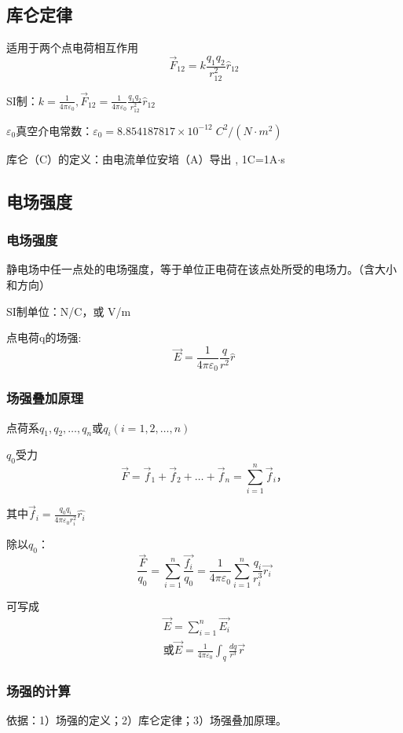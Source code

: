 \documentclass[12pt, UTF8, AutoFakeBold]{ctexart} %
\begin{document}
\subsection{库仑定律}
适用于两个点电荷相互作用
\[
    \vec{F}_{12}=k\frac{q_1q_2}{r_{12}^2}\hat{r}_{12}
\]

SI制：$k=\frac{1}{4\pi\varepsilon_0},\vec{F}_{12}=\frac{1}{4\pi\varepsilon_0}\frac{q_1q_2}{r_{12}^2}\hat{r}_{12}$

$\varepsilon_0$真空介电常数：$\varepsilon_0=8.854187817\times 10^{-12}\;C^2/(N\cdot m^2)$

库仑（C）的定义：由电流单位安培（A）导出 , 1C=1A$\cdot$s

\subsection{电场强度}
\subsubsection{电场强度}
静电场中任一点处的电场强度，等于单位正电荷在该点处所受的电场力。（含大小和方向）

SI制单位：N/C，或 V/m

点电荷q的场强:
\[
    \vec{E}=\frac{1}{4\pi\varepsilon_0}\frac{q}{r^2}\hat{r}
\]
\subsubsection{场强叠加原理}
点荷系$q_1,q_2,\dots,q_n$或$q_i(i=1,2,\dots,n)$

$q_0$受力
\[
    \vec{F}=\vec{f}_1+\vec{f}_2+\dots+\vec{f}_n=\sum\limits_{i=1}^{n}\vec{f}_i，
\]

其中$\vec{f}_i=\frac{q_0q_i}{4\pi\varepsilon_0r_i^2}\hat{r_i}$

除以$q_0$：
\[
    \frac{\vec{F}}{q_0}=\sum\limits_{i=1}^{n}\frac{\vec{f_i}}{q_0}=
    \frac{1}{4\pi\varepsilon_0}\sum\limits_{i=1}^{n}\frac{q_i}{r_i^3}\vec{r_i}
\]

可写成
\begin{gather*}
    \vec{E}=\sum\limits_{i=1}^{n}\vec{E_i}\\
    \text{或}\vec{E}=\frac{1}{4\pi\varepsilon_0}\int_{q}\frac{dq}{r^3}\vec{r}
\end{gather*}
\subsubsection{场强的计算}
依据：1）场强的定义；2）库仑定律；3）场强叠加原理。
\end{document}
